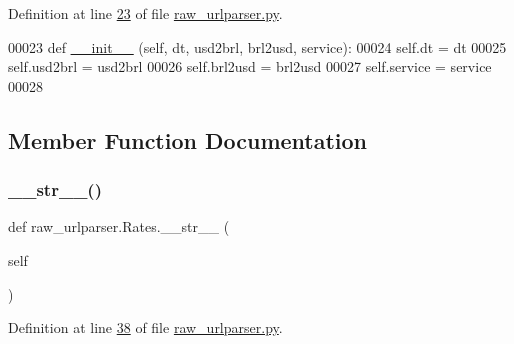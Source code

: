 Definition at line \hyperlink{raw__urlparser_8py_source_l00023}{23} of file \hyperlink{raw__urlparser_8py_source}{raw\+\_\+urlparser.\+py}.


\begin{DoxyCode}
00023     \textcolor{keyword}{def }\hyperlink{namespacestart__time_a9c9bd378729a13c96a22c8b079ea172c}{\_\_init\_\_} (self, dt, usd2brl, brl2usd, service):
00024         self.dt  = dt
00025         self.usd2brl = usd2brl
00026         self.brl2usd = brl2usd
00027         self.service = service
00028     
\end{DoxyCode}


\subsection{Member Function Documentation}
\mbox{\label{classraw__urlparser_1_1_rates_a3e8a9922ba7e95bd54945c87d07e5f0e}} 
\subsubsection{\texorpdfstring{\+\_\+\+\_\+str\+\_\+\+\_\+()}{\_\_str\_\_()}}
{\footnotesize\ttfamily def raw\+\_\+urlparser.\+Rates.\+\_\+\+\_\+str\+\_\+\+\_\+ (\begin{DoxyParamCaption}\item[{}]{self }\end{DoxyParamCaption})}



Definition at line \hyperlink{raw__urlparser_8py_source_l00038}{38} of file \hyperlink{raw__urlparser_8py_source}{raw\+\_\+urlparser.\+py}.



